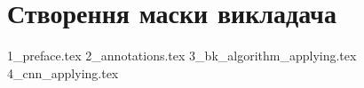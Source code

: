 \chapter{Створення маски викладача}
{1_preface.tex}
{2_annotations.tex}
{3_bk_algorithm_applying.tex}
{4_cnn_applying.tex}